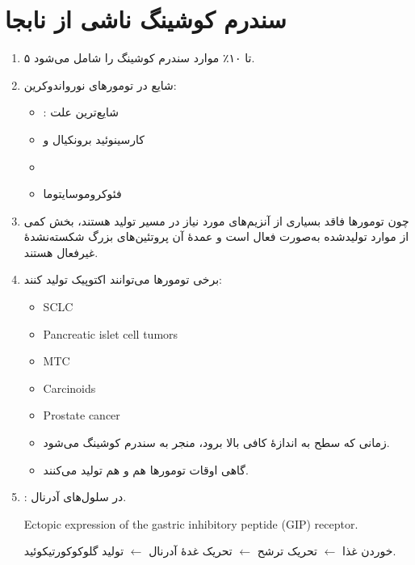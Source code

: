 \documentclass[a4paper,12pt]{article}
\begin{document}
\section*{سندرم کوشینگ ناشی از  نابجا}
\begin{enumerate}[label=\arabic*.,start=1]
\item ۵ تا ۱۰٪ موارد سندرم کوشینگ را شامل می‌شود.
\item شایع در تومورهای نورواندوکرین:
\begin{itemize}
\item {}: شایع‌ترین علت
\item کارسینوئید برونکیال و 
\item {}
\item فئوکروموسایتوما
\end{itemize}
\item چون تومورها فاقد بسیاری از آنزیم‌های مورد نیاز در مسیر تولید  هستند، بخش کمی از موارد تولیدشده به‌صورت  فعال است و عمدهٔ آن پروتئین‌های بزرگ شکسته‌نشدهٔ غیرفعال هستند.
\item برخی تومورها می‌توانند  اکتوپیک تولید کنند:
\begin{latin}
\begin{itemize}
\item SCLC
\item Pancreatic islet cell tumors
\item MTC
\item Carcinoids
\item Prostate cancer
\end{itemize}
\end{latin}
\begin{itemize}
\item زمانی که سطح  به اندازهٔ کافی بالا برود، منجر به سندرم کوشینگ می‌شود.
\item گاهی اوقات تومورها هم  و هم  تولید می‌کنند.
\end{itemize}
\item {}: در سلول‌های آدرنال.
\begin{latin}
\noindent Ectopic expression of the gastric inhibitory peptide (GIP) receptor.
\end{latin}
خوردن غذا $\leftarrow$ تحریک ترشح  $\leftarrow$ تحریک غدهٔ آدرنال $\leftarrow$ تولید گلوکوکورتیکوئید.
\end{enumerate}
\end{document}
